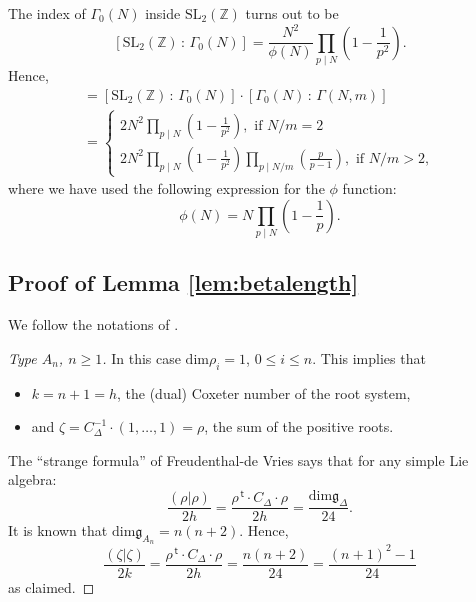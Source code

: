 \documentclass{article}
\theoremstyle{definition}
\newcommand{\ZZ} {{\mathbb Z}}		%
\renewcommand{\top}{\,\mathsf{t}}
\begin{document}
The index of $\Gamma_0(N)$ inside $\mathrm{SL}_2(\ZZ)$ turns out to be
\[  [\mathrm{SL}_2(\ZZ) \, : \, \Gamma_0(N) ]=\frac{N^2}{\phi(N)}\prod_{p \mid N}\left(1-\frac{1}{p^2} \right). \]
Hence,
\begin{multline*} [\mathrm{SL}_2(\ZZ) \, : \, \Gamma(N,m) ] = [\mathrm{SL}_2(\ZZ) \, : \, \Gamma_0(N) ] \cdot [\Gamma_0(N) \, : \, \Gamma(N,m) ] \\
=\begin{cases} 
2N^2\prod_{p \mid N}\left(1-\frac{1}{p^2} \right),\textrm{ if } N/m =2 \\
2N^2\prod_{p \mid N}\left(1-\frac{1}{p^2} \right) \prod_{p \mid N/m }\left(\frac{p}{p-1} \right),\textrm{ if } N/m >2,
\end{cases}
\end{multline*}
where we have used the following expression for the $\phi$ function:
\[ \phi(N)=N \prod_{p \mid  N}\left(1-\frac{1}{p} \right). \]

\subsection{Proof of Lemma \ref{lem:betalength}}
\label{sec:app1}
We follow the notations of \cite{bourbaki2002lie}. %
\begin{proof}[Type $A_n$, $n \geq 1$]
	\label{sec:app11}
	In this case $\mathrm{dim} \rho_i = 1$, $0 \leq i \leq n$. This implies that 
	\begin{itemize}
		\item $k=n+1=h$, the (dual) Coxeter number of the root system,
		\item and $\zeta = C_{\Delta}^{-1} \cdot (1,\dots,1)= \rho$, the sum of the positive roots.
	\end{itemize}
	The ``strange formula'' of Freudenthal-de Vries \cite{freudenthal1969linear} says that for any simple Lie algebra:
	\[ \frac{(\rho|\rho)}{2h}=\frac{\rho^{\top} \cdot C_\Delta \cdot \rho}{2h}=\frac{\mathrm{dim} \mathfrak{g}_{\Delta}}{24}. \]
	It is known that $\mathrm{dim} \mathfrak{g}_{A_n}= n(n+2)$. Hence,
	\[ \frac{(\zeta|\zeta)}{2k}=\frac{\rho^{\top} \cdot C_\Delta \cdot \rho}{2h}=\frac{n(n+2)}{24}=\frac{(n+1)^2-1}{24} \]
	as claimed.
\end{proof}
\end{document}
